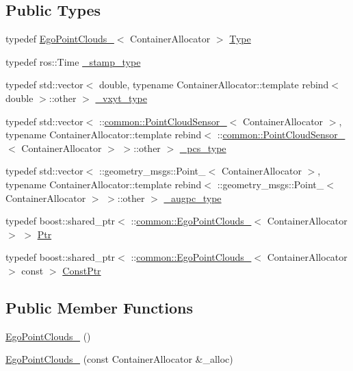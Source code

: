 \subsection*{Public Types}
\begin{DoxyCompactItemize}
\item 
typedef \hyperlink{structcommon_1_1EgoPointClouds__}{Ego\+Point\+Clouds\+\_\+}$<$ Container\+Allocator $>$ \hyperlink{structcommon_1_1EgoPointClouds___a83da392af07337950eee7da1f9ee9392}{Type}
\item 
typedef ros\+::\+Time \hyperlink{structcommon_1_1EgoPointClouds___a45a194b26ca8e4132a7d5e02e659d68f}{\+\_\+stamp\+\_\+type}
\item 
typedef std\+::vector$<$ double, typename Container\+Allocator\+::template rebind$<$ double $>$\+::other $>$ \hyperlink{structcommon_1_1EgoPointClouds___a92f4c266292be35a268030b544d34d6d}{\+\_\+vxyt\+\_\+type}
\item 
typedef std\+::vector$<$ \+::\hyperlink{structcommon_1_1PointCloudSensor__}{common\+::\+Point\+Cloud\+Sensor\+\_\+}$<$ Container\+Allocator $>$, typename Container\+Allocator\+::template rebind$<$ \+::\hyperlink{structcommon_1_1PointCloudSensor__}{common\+::\+Point\+Cloud\+Sensor\+\_\+}$<$ Container\+Allocator $>$ $>$\+::other $>$ \hyperlink{structcommon_1_1EgoPointClouds___ae9a969cfa2bb2b88e7c3dad0cfe9373d}{\+\_\+pcs\+\_\+type}
\item 
typedef std\+::vector$<$ \+::geometry\+\_\+msgs\+::\+Point\+\_\+$<$ Container\+Allocator $>$, typename Container\+Allocator\+::template rebind$<$ \+::geometry\+\_\+msgs\+::\+Point\+\_\+$<$ Container\+Allocator $>$ $>$\+::other $>$ \hyperlink{structcommon_1_1EgoPointClouds___ab7459c5c41c654d199a21f760dd00379}{\+\_\+augpc\+\_\+type}
\item 
typedef boost\+::shared\+\_\+ptr$<$ \+::\hyperlink{structcommon_1_1EgoPointClouds__}{common\+::\+Ego\+Point\+Clouds\+\_\+}$<$ Container\+Allocator $>$ $>$ \hyperlink{structcommon_1_1EgoPointClouds___a6e66bc07ffbc33db89dfb13c66a5a4cd}{Ptr}
\item 
typedef boost\+::shared\+\_\+ptr$<$ \+::\hyperlink{structcommon_1_1EgoPointClouds__}{common\+::\+Ego\+Point\+Clouds\+\_\+}$<$ Container\+Allocator $>$ const  $>$ \hyperlink{structcommon_1_1EgoPointClouds___af65d2da0bc1ac27030e411cd9c0f5db3}{Const\+Ptr}
\end{DoxyCompactItemize}
\subsection*{Public Member Functions}
\begin{DoxyCompactItemize}
\item 
\hyperlink{structcommon_1_1EgoPointClouds___a77125cde5a50a5f817515b39a87d6080}{Ego\+Point\+Clouds\+\_\+} ()
\item 
\hyperlink{structcommon_1_1EgoPointClouds___adf97210e8d50943a684ad8e6307a6636}{Ego\+Point\+Clouds\+\_\+} (const Container\+Allocator \&\+\_\+alloc)
\end{DoxyCompactItemize}
